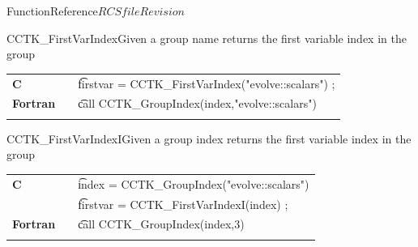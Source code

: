 \begin{cactuspart}{FunctionReference}{$RCSfile$}{$Revision$}
\begin{CCTKFunc}{CCTK\_FirstVarIndex}{Given a group name returns the first variable index in the group}
\label{CCTK-FirstVarIndex}
\showargs
\begin{params}
\end{params}
\begin{discussion}
\end{discussion}
\begin{examples}
\begin{tabular}{@{}p{3cm}cp{11cm}}
\hfill {\bf C} && {\t firstvar = CCTK\_FirstVarIndex("evolve::scalars") ;}
\\
\hfill {\bf Fortran} && {\t call CCTK\_GroupIndex(index,"evolve::scalars")}\\
\\
\end{tabular}
\end{examples}
\begin{errorcodes}
\end{errorcodes}
\end{CCTKFunc}


\begin{CCTKFunc}{CCTK\_FirstVarIndexI}{Given a group index returns the first variable index in the group}
\label{CCTK-FirstVarIndexI}
\showargs
\begin{params}
\end{params}
\begin{discussion}
\end{discussion}
\begin{examples}
\begin{tabular}{@{}p{3cm}cp{11cm}}
\hfill {\bf C} && {\t index = CCTK\_GroupIndex("evolve::scalars")}\\
               &&{\t firstvar = CCTK\_FirstVarIndexI(index) ;}
\\
\hfill {\bf Fortran} && {\t call CCTK\_GroupIndex(index,3)}\\
\\
\end{tabular}
\end{examples}
\begin{errorcodes}
\end{errorcodes}
\end{CCTKFunc}



\end{cactuspart}
